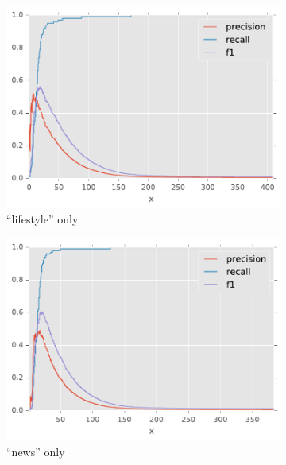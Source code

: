 \begin{figure}[H]
\begin{subfigure}[t]{.4\textwidth}
\centering\includegraphics[]{figures/reddit-lifestyle-only-f1.pdf}
\caption{``lifestyle'' only}
\label{fig-reddit-lifestyle-only-f1}
\end{subfigure}
\begin{subfigure}[t]{.4\textwidth}
\centering\includegraphics[]{figures/reddit-news-only-f1.pdf}
\caption{``news'' only}
\label{fig-reddit-news-only-f1}
\end{subfigure}
\begin{subfigure}[t]{.4\textwidth}

\end{subfigure}
\end{figure}
